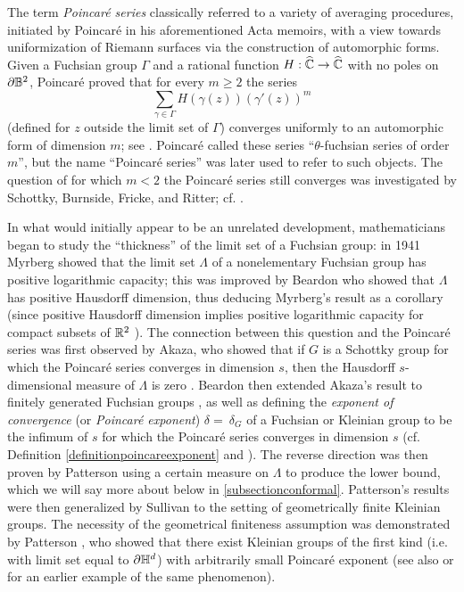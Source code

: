 The term \emph{Poincar\'e series} classically referred to a variety of averaging procedures, initiated by Poincar\'e in his aforementioned Acta memoirs, with a view towards uniformization of Riemann surfaces via the construction of automorphic forms. Given a Fuchsian group $\Gamma$ and a rational function $H:\what\C\to\what\C$ with no poles on $\del\B^2$, Poincar\'e proved that for every $m\geq 2$ the series
\[
\sum_{\gamma \in \Gamma} H(\gamma(z))(\gamma'(z))^m
\]
(defined for $z$ outside the limit set of $\Gamma$) converges uniformly to an automorphic form of dimension $m$; see \cite[p.218]{Saint-Gervais}. Poincar\'e called these series ``$\theta$-fuchsian series of order $m$'', but the name ``Poincar\'e series'' was later used to refer to such objects. The question of for which $m < 2$ the Poincar\'e series still converges was investigated by Schottky, Burnside, Fricke, and Ritter; cf. \cite[pp.37-38]{AdelmannGerbracht}.

In what would initially appear to be an unrelated development, mathematicians began to study the ``thickness'' of the limit set of a Fuchsian group: in 1941 Myrberg \cite{Myrberg} showed that the limit set $\Lambda$ of a nonelementary Fuchsian group has positive logarithmic capacity; this was improved by Beardon \cite{Beardon2} who showed that $\Lambda$ has positive Hausdorff dimension, thus deducing Myrberg's result as a corollary (since positive Hausdorff dimension implies positive logarithmic capacity for compact subsets of $\R^2$ \cite{Taylor}). The connection between this question and the Poincar\'e series was first observed by Akaza, who showed that if $G$ is a Schottky group for which the Poincar\'e series converges in dimension $s$, then the Hausdorff $s$-dimensional measure of $\Lambda$ is zero \cite[Corollary of Theorem A]{Akaza2}. Beardon then extended Akaza's result to finitely generated Fuchsian groups \cite[Theorem 5]{Beardon3}, as well as defining the \emph{exponent of convergence} (or \emph{Poincar\'e exponent}) $\delta = \ \delta_G$ of a Fuchsian or Kleinian group to be the infimum of $s$ for which the Poincar\'e series converges in dimension $s$ (cf. Definition \ref{definitionpoincareexponent} and \cite{Beardon1}). The reverse direction was then proven by Patterson \cite{Patterson2} using a certain measure on $\Lambda$ to produce the lower bound, which we will say more about below in \6\ref{subsectionconformal}. Patterson's results were then generalized by Sullivan \cite{Sullivan_density_at_infinity} to the setting of geometrically finite Kleinian groups. The necessity of the geometrical finiteness assumption was demonstrated by Patterson \cite{Patterson3}, who showed that there exist Kleinian groups of the first kind (i.e. with limit set equal to $\del\H^d$) with arbitrarily small Poincar\'e exponent \cite{Patterson3} (see also \cite{Hopf_statistik} or \cite[Example 8]{Starkov} for an earlier example of the same phenomenon).

